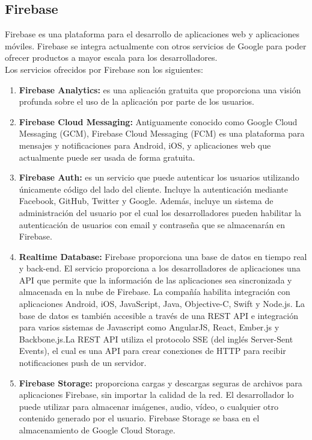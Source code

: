 \subsection{Firebase}
Firebase es una plataforma para el desarrollo de aplicaciones web y aplicaciones móviles. Firebase se integra actualmente con otros servicios de Google para poder ofrecer productos a mayor escala para los desarrolladores.
\\
Los servicios ofrecidos por Firebase son los siguientes: 
\begin{enumerate}
\item \textbf{Firebase Analytics: } es una aplicación gratuita que proporciona una visión profunda sobre el uso de la aplicación por parte de los usuarios.
\item \textbf{Firebase Cloud Messaging: }
Antiguamente conocido como Google Cloud Messaging (GCM), Firebase Cloud Messaging (FCM) es una plataforma para mensajes y notificaciones para Android, iOS, y aplicaciones web que actualmente puede ser usada de forma gratuita.
\item \textbf{Firebase Auth:} es un servicio que puede autenticar los usuarios utilizando únicamente código del lado del cliente. Incluye la autenticación mediante Facebook, GitHub, Twitter y Google. Además, incluye un sistema de administración del usuario por el cual los desarrolladores pueden habilitar la autenticación de usuarios con email y contraseña que se almacenarán en Firebase.

\item \textbf{Realtime Database:}
Firebase proporciona una base de datos en tiempo real y back-end. El servicio proporciona a los desarrolladores de aplicaciones una API que permite que la información de las aplicaciones sea sincronizada y almacenada en la nube de Firebase. La compañía habilita integración con aplicaciones Android, iOS, JavaScript, Java, Objective-C, Swift y Node.js. La base de datos es también accesible a través de una REST API e integración para varios sistemas de Javascript como AngularJS, React, Ember.js y Backbone.js.La REST API utiliza el protocolo SSE (del inglés Server-Sent Events), el cual es una API para crear conexiones de HTTP para recibir notificaciones push de un servidor.

\item \textbf{Firebase Storage:} proporciona cargas y descargas seguras de archivos para aplicaciones Firebase, sin importar la calidad de la red. El desarrollador lo puede utilizar para almacenar imágenes, audio, vídeo, o cualquier otro contenido generado por el usuario. Firebase Storage se basa en el almacenamiento de Google Cloud Storage.



\end{enumerate}
